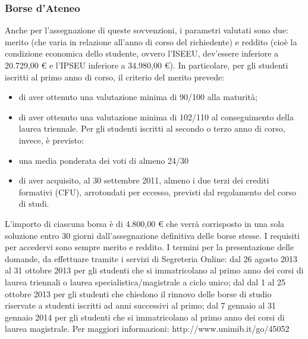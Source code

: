 \subsubsection{Borse d'Ateneo}
Anche per l'assegnazione di queste sovvenzioni, i parametri valutati sono due: merito (che varia in relazione all'anno di corso del richiedente) e reddito (cioè la condizione economica dello studente, ovvero l'ISEEU, dev'essere inferiore a 20.729,00 € e l'IPSEU inferiore a 34.980,00 €). 
In particolare, per gli studenti iscritti al primo anno di corso, il criterio del merito prevede: 
\begin{itemize}
\item di aver ottenuto una valutazione minima di 90/100 alla maturità; 
\item di aver ottenuto una valutazione minima di 102/110 al conseguimento della laurea triennale. 
Per gli studenti iscritti al secondo o terzo anno di corso, invece, è previsto: 
\item una media ponderata dei voti di almeno 24/30 
\item di  aver acquisito, al 30 settembre 2011, almeno i  due terzi dei crediti formativi (CFU), arrotondati per eccesso, previsti dal regolamento del corso di studi. 
\end{itemize}
L'importo di ciascuna borsa è di 4.800,00 € che verrà corrisposto in una sola soluzione entro 30 giorni dall'assegnazione definitiva delle borse stesse. I requisiti per accedervi sono sempre merito e reddito.
I termini per la  presentazione delle domande, da effettuare tramite i servizi di Segreteria Online: dal 26 agosto 2013 al 31 ottobre 2013 per gli studenti che si immatricolano al primo anno dei corsi di laurea triennali o laurea specialistica/magistrale a ciclo unico; dal dal 1 al 25 ottobre 2013 per gli studenti che chiedono il rinnovo delle borse di studio riservate a studenti iscritti ad anni successivi al primo; dal 7 gennaio al 31 gennaio 2014 per gli studenti che si immatricolano al primo anno dei corsi di laurea magistrale. 
Per maggiori informazioni: http://www.unimib.it/go/45052
